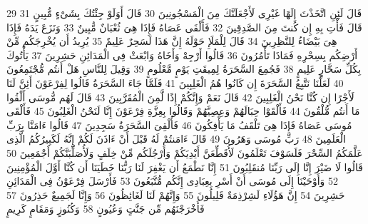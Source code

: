 \documentclass[20pt,a4paper]{article}
\begin{document}
{\tiny\colorbox{cl_aya}{29}} قَالَ لَئِنِ اتَّخَذْتَ إِلَهًا غَيْرِى لَأَجْعَلَنَّكَ مِنَ الْمَسْجُونِينَ
{\tiny\colorbox{cl_aya}{30}} قَالَ أَوَلَوْ جِئْتُكَ بِشَىْءٍ مُّبِينٍ
{\tiny\colorbox{cl_aya}{31}} قَالَ فَأْتِ بِهِ إِن كُنتَ مِنَ الصَّدِقِينَ
{\tiny\colorbox{cl_aya}{32}} فَأَلْقَى عَصَاهُ فَإِذَا هِىَ ثُعْبَانٌ مُّبِينٌ
{\tiny\colorbox{cl_aya}{33}} وَنَزَعَ يَدَهُ فَإِذَا هِىَ بَيْضَاءُ لِلنَّظِرِينَ
{\tiny\colorbox{cl_aya}{34}} قَالَ لِلْمَلَإِ حَوْلَهُ إِنَّ هَذَا لَسَحِرٌ عَلِيمٌ
{\tiny\colorbox{cl_aya}{35}} يُرِيدُ أَن يُخْرِجَكُم مِّنْ أَرْضِكُم بِسِحْرِهِ فَمَاذَا تَأْمُرُونَ
{\tiny\colorbox{cl_aya}{36}} قَالُوا أَرْجِهْ وَأَخَاهُ وَابْعَثْ فِى الْمَدَائِنِ حَشِرِينَ
{\tiny\colorbox{cl_aya}{37}} يَأْتُوكَ بِكُلِّ سَحَّارٍ عَلِيمٍ
{\tiny\colorbox{cl_aya}{38}} فَجُمِعَ السَّحَرَةُ لِمِيقَتِ يَوْمٍ مَّعْلُومٍ
{\tiny\colorbox{cl_aya}{39}} وَقِيلَ لِلنَّاسِ هَلْ أَنتُم مُّجْتَمِعُونَ
{\tiny\colorbox{cl_aya}{40}} لَعَلَّنَا نَتَّبِعُ السَّحَرَةَ إِن كَانُوا هُمُ الْغَلِبِينَ
{\tiny\colorbox{cl_aya}{41}} فَلَمَّا جَاءَ السَّحَرَةُ قَالُوا لِفِرْعَوْنَ أَئِنَّ لَنَا لَأَجْرًا إِن كُنَّا نَحْنُ الْغَلِبِينَ
{\tiny\colorbox{cl_aya}{42}} قَالَ نَعَمْ وَإِنَّكُمْ إِذًا لَّمِنَ الْمُقَرَّبِينَ
{\tiny\colorbox{cl_aya}{43}} قَالَ لَهُم مُّوسَى أَلْقُوا مَا أَنتُم مُّلْقُونَ
{\tiny\colorbox{cl_aya}{44}} فَأَلْقَوْا حِبَالَهُمْ وَعِصِيَّهُمْ وَقَالُوا بِعِزَّةِ فِرْعَوْنَ إِنَّا لَنَحْنُ الْغَلِبُونَ
{\tiny\colorbox{cl_aya}{45}} فَأَلْقَى مُوسَى عَصَاهُ فَإِذَا هِىَ تَلْقَفُ مَا يَأْفِكُونَ
{\tiny\colorbox{cl_aya}{46}} فَأُلْقِىَ السَّحَرَةُ سَجِدِينَ
{\tiny\colorbox{cl_aya}{47}} قَالُوا ءَامَنَّا بِرَبِّ الْعَلَمِينَ
{\tiny\colorbox{cl_aya}{48}} رَبِّ مُوسَى وَهَرُونَ
{\tiny\colorbox{cl_aya}{49}} قَالَ ءَامَنتُمْ لَهُ قَبْلَ أَنْ ءَاذَنَ لَكُمْ إِنَّهُ لَكَبِيرُكُمُ الَّذِى عَلَّمَكُمُ السِّحْرَ فَلَسَوْفَ تَعْلَمُونَ لَأُقَطِّعَنَّ أَيْدِيَكُمْ وَأَرْجُلَكُم مِّنْ خِلَفٍ وَلَأُصَلِّبَنَّكُمْ أَجْمَعِينَ
{\tiny\colorbox{cl_aya}{50}} قَالُوا لَا ضَيْرَ إِنَّا إِلَى رَبِّنَا مُنقَلِبُونَ
{\tiny\colorbox{cl_aya}{51}} إِنَّا نَطْمَعُ أَن يَغْفِرَ لَنَا رَبُّنَا خَطَيَنَا أَن كُنَّا أَوَّلَ الْمُؤْمِنِينَ
{\tiny\colorbox{cl_aya}{52}} وَأَوْحَيْنَا إِلَى مُوسَى أَنْ أَسْرِ بِعِبَادِى إِنَّكُم مُّتَّبَعُونَ
{\tiny\colorbox{cl_aya}{53}} فَأَرْسَلَ فِرْعَوْنُ فِى الْمَدَائِنِ حَشِرِينَ
{\tiny\colorbox{cl_aya}{54}} إِنَّ هَؤُلَاءِ لَشِرْذِمَةٌ قَلِيلُونَ
{\tiny\colorbox{cl_aya}{55}} وَإِنَّهُمْ لَنَا لَغَائِظُونَ
{\tiny\colorbox{cl_aya}{56}} وَإِنَّا لَجَمِيعٌ حَذِرُونَ
{\tiny\colorbox{cl_aya}{57}} فَأَخْرَجْنَهُم مِّن جَنَّتٍ وَعُيُونٍ
{\tiny\colorbox{cl_aya}{58}} وَكُنُوزٍ وَمَقَامٍ كَرِيمٍ
\end{document}
